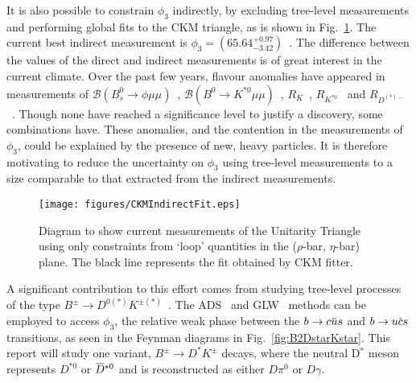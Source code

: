 \documentclass[oneside,12pt]{article}
\newcommand{\overbar}[1]{\mkern 1.5mu\overline{\mkern-1.5mu#1\mkern-1.5mu}\mkern
1.5mu}
\begin{document}
It is also possible to constrain $\phi_3$ indirectly, by excluding tree-level
measurements and performing global fits to the CKM triangle, as is shown in
Fig.~\ref{fig:CKMIndirectFit}. The current best indirect measurement is
$\phi_3=(65.64^{+0.97}_{-3.42})$\degree~\cite{website:CKMFitter}. The
difference between the values of the direct and indirect measurements is of
great interest in the current climate. Over the past few years, flavour
anomalies have appeared in measurements of $\mathcal{B} (B^{0}_{s}\rightarrow
\phi \mu \mu)$~\cite{B2phimumu}, $\mathcal{B} (B^{0}\rightarrow K^{*0} \mu
\mu)$~\cite{B2Kstmumu}, $R_{K}$~\cite{Rk}, $R_{K^{*0}}$~\cite{Rkst} and
$R_{D^{(*)-}}$~\cite{RDst}. Though none have reached a significance level to
justify a discovery, some combinations have. These anomalies, and the
contention in the measurements of $\phi_3$, could be explained by the presence
of new, heavy particles. It is therefore motivating to reduce the uncertainty
on $\phi_{3}$ using tree-level measurements to a size comparable to that
extracted from the indirect measurements.
\begin{figure}[htp]
\vspace*{-5mm}
	\centering \texttt{[image: figures/CKMIndirectFit.eps]}
\caption{{Diagram to show current measurements of the Unitarity Triangle
using only constraints from `loop' quantities in the ($\rho$-bar, $\eta$-bar)
plane. The black line represents the fit obtained by CKM fitter.}}
\label{fig:CKMIndirectFit} \vspace{-10pt}
\end{figure}
A significant contribution to this effort comes from studying tree-level
processes of the type $B^{\pm}\rightarrow D^{0(*)}K^{\pm (*)}$~\cite{B2DKD2hh,
DalitzRun1, DalitzRun2, B2DKstD2hh, B2DstKD2hh}. The ADS~\cite{ADSRef} and
GLW~\cite{GLWRef} methods can be employed to access $\phi_3$, the relative weak
phase between the $b\rightarrow c\overbar{u}s$ and $b\rightarrow u\overbar{c}s$
transitions, as seen in the Feynman diagrams in Fig.~\ref{fig:B2DstarKstar}.
This report will study one variant, $B^{\pm}\rightarrow D^{*}K^{\pm}$ decays,
where the neutral D$^{*}$ meson represents $D^{*0}$ or $\overbar{D}^{*0}$ and
is reconstructed as either $D\pi^{0}$ or $D\gamma$. 
\end{document}
